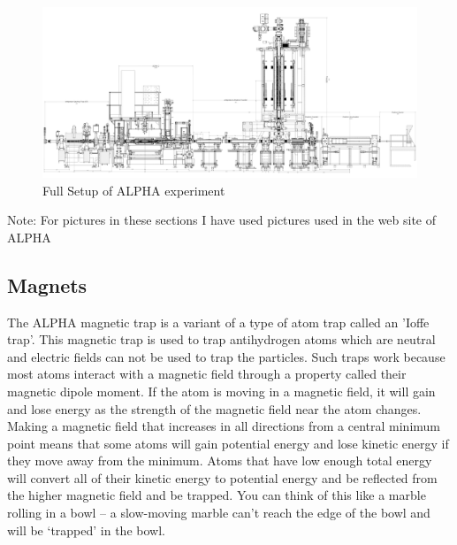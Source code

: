 \documentclass{article}
\begin{document}
\begin{figure}[h]
\centering
\includegraphics[scale=0.09]{full_map}
\caption{Full Setup of ALPHA experiment}
\label{fig:full_map}
\end{figure}

Note: For pictures in these sections I have used pictures used in the web site of ALPHA 
\subsection{Magnets}
\label{Magnets} 
The ALPHA magnetic trap is a variant of a type of atom trap called an 'Ioffe trap'. This magnetic trap is used to trap antihydrogen atoms which are neutral and electric fields can not be used to trap the particles. Such traps work because most atoms interact with a magnetic field through a property called their magnetic dipole moment. If the atom is moving in a magnetic field, it will gain and lose energy as the strength of the magnetic field near the atom changes. Making a magnetic field that increases in all directions from a central minimum point means that some atoms will gain potential energy and lose kinetic energy if they move away from the minimum. Atoms that have low enough total energy will convert all of their kinetic energy to potential energy and be reflected from the higher magnetic field and be trapped. You can think of this like a marble rolling in a bowl -- a slow-moving marble can't reach the edge of the bowl and will be `trapped' in the bowl.
\end{document}

